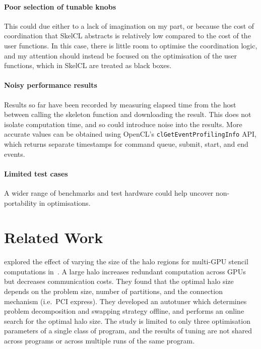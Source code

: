 \paragraph{Poor selection of tunable knobs} This could due either to a
lack of imagination on my part, or because the cost of coordination
that SkelCL abstracts is relatively low compared to the cost of the
user functions. In this case, there is little room to optimise the
coordination logic, and my attention should instead be focused on the
optimisation of the user functions, which in SkelCL are treated as
black boxes.

\paragraph{Noisy performance results} Results so far have been
recorded by measuring elapsed time from the host between calling the
skeleton function and downloading the result. This does not isolate
computation time, and so could introduce noise into the results. More
accurate values can be obtained using OpenCL's
\texttt{clGetEventProfilingInfo} API, which returns separate
timestamps for command queue, submit, start, and end events.

\paragraph{Limited test cases} A wider range of benchmarks and test
hardware could help uncover non-portability in optimisations.

\section{Related Work}

\citeauthor{Lutz2013} explored the effect of varying the size of the
halo regions for multi-GPU stencil computations in~\cite{Lutz2013}. A
large halo increases redundant computation across GPUs but decreases
communication costs. They found that the optimal halo size depends on
the problem size, number of partitions, and the connection mechanism
(i.e.\ PCI express). They developed an autotuner which determines
problem decomposition and swapping strategy offline, and performs an
online search for the optimal halo size. The study is limited to only
three optimisation parameters of a single class of program, and the
results of tuning are not shared across programs or across multiple
runs of the same program.



